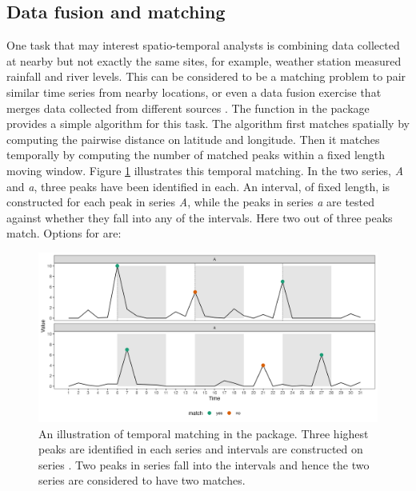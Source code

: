 \documentclass[
  shortnames]{jss}
\begin{document}
\hypertarget{matching}{%
\subsection{Data fusion and matching}\label{matching}}

One task that may interest spatio-temporal analysts is combining data collected at nearby but not exactly the same sites, for example, weather station measured rainfall and river levels. This can be considered to be a matching problem \citep{stuart2010matching, mcintosh2018using} to pair similar time series from nearby locations, or even a data fusion exercise that merges data collected from different sources \citep{cocchi2019data}. The function  in the  package provides a simple algorithm for this task. The algorithm first matches spatially by computing the pairwise distance on latitude and longitude. Then it matches temporally by computing the number of matched peaks within a fixed length moving window. Figure \ref{fig:illu-matching} illustrates this temporal matching. In the two series, \emph{A} and \emph{a}, three peaks have been identified in each. An interval, of fixed length, is constructed for each peak in series \emph{A}, while the peaks in series \emph{a} are tested against whether they fall into any of the intervals. Here two out of three peaks match. Options for  are:

\begin{CodeChunk}
\begin{figure}

{\centering \includegraphics[width=1\linewidth]{../figures/illu-matching} 

}

\caption{An illustration of temporal matching in the  package. Three highest peaks are identified in each series and intervals are constructed on series . Two peaks in series  fall into the intervals and hence the two series are considered to have two matches.}\label{fig:illu-matching}
\end{figure}
\end{CodeChunk}
\end{document}
